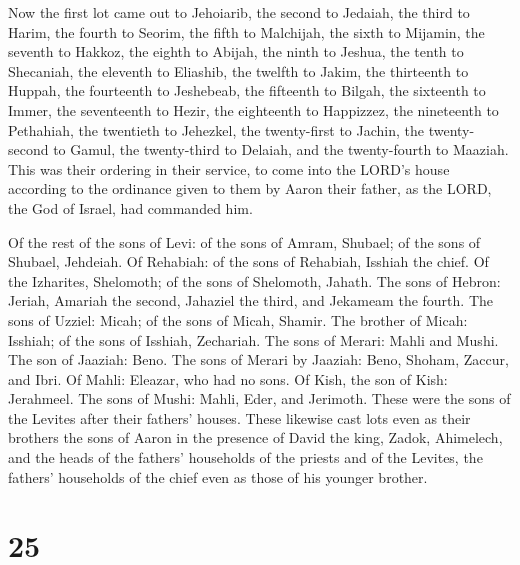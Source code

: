  Now the first lot came out to Jehoiarib, the second to
Jedaiah,  the third to Harim, the fourth to Seorim,
 the fifth to Malchijah, the sixth to Mijamin, 
the seventh to Hakkoz, the eighth to Abijah,  the ninth to
Jeshua, the tenth to Shecaniah,  the eleventh to Eliashib,
the twelfth to Jakim,  the thirteenth to Huppah, the
fourteenth to Jeshebeab,  the fifteenth to Bilgah, the
sixteenth to Immer,  the seventeenth to Hezir, the
eighteenth to Happizzez,  the nineteenth to Pethahiah, the
twentieth to Jehezkel,  the twenty-first to Jachin, the
twenty-second to Gamul,  the twenty-third to Delaiah, and
the twenty-fourth to Maaziah.  This was their ordering in
their service, to come into the LORD's house according to the ordinance
given to them by Aaron their father, as the LORD, the God of Israel, had
commanded him.

 Of the rest of the sons of Levi: of the sons of Amram,
Shubael; of the sons of Shubael, Jehdeiah.  Of Rehabiah: of
the sons of Rehabiah, Isshiah the chief.  Of the Izharites,
Shelomoth; of the sons of Shelomoth, Jahath.  The sons of
Hebron: Jeriah, Amariah the second, Jahaziel the third, and Jekameam the
fourth.  The sons of Uzziel: Micah; of the sons of Micah,
Shamir.  The brother of Micah: Isshiah; of the sons of
Isshiah, Zechariah.  The sons of Merari: Mahli and Mushi.
The son of Jaaziah: Beno.  The sons of Merari by Jaaziah:
Beno, Shoham, Zaccur, and Ibri.  Of Mahli: Eleazar, who had
no sons.  Of Kish, the son of Kish: Jerahmeel.
 The sons of Mushi: Mahli, Eder, and Jerimoth. These were
the sons of the Levites after their fathers' houses.  These
likewise cast lots even as their brothers the sons of Aaron in the
presence of David the king, Zadok, Ahimelech, and the heads of the
fathers' households of the priests and of the Levites, the fathers'
households of the chief even as those of his younger brother.

\hypertarget{section-24}{%
\section{25}\label{section-24}}


